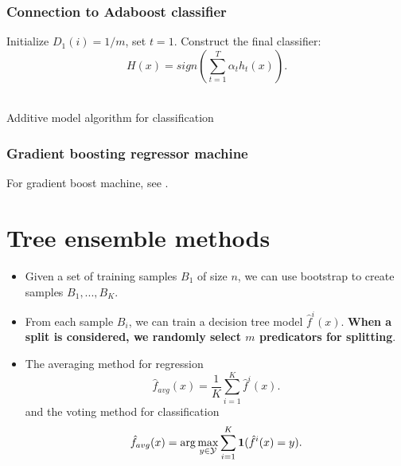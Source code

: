 \begin{refsection}
\subsubsection{Connection to Adaboost classifier}


\begin{algorithm}[H]
	\SetAlgoLined
	Initialize $D_1(i) = 1/m$, set $t = 1$.
	Construct the final classifier:
	$$H(x) = sign(\sum_{t=1}^T \alpha_t h_t(x)).$$	\\
	\caption{Additive model algorithm for classification}
\end{algorithm}


\subsubsection{Gradient boosting regressor machine}


For gradient boost machine, see \cite{friedman2001greedy}.




\section{Tree ensemble methods}



\begin{definition}\cite[320]{james2013introduction}\hfill
	\begin{itemize}
		\item Given a set of training samples $B_1$ of size $n$, we can use bootstrap to create samples $B_1,...,B_K$. 
		\item From each sample $B_i$, we can train a decision tree model $\hat{f}^i(x)$. \textbf{When a split is considered, we randomly select $m$ predicators for splitting}.
		\item The averaging method for regression
		$$\hat{f}_{avg}(x) = \frac{1}{K}\sum_{i=1}^K \hat{f}^i(x).$$
		and the voting method for classification
		$$\hat{f}_{avg}(x) = \arg\max_{y\in \mathcal{Y}} \sum_{i=1}^K \bm{1}(\hat{f}^i(x) = y).$$
		

\end{itemize}
\end{definition}
\end{refsection}
